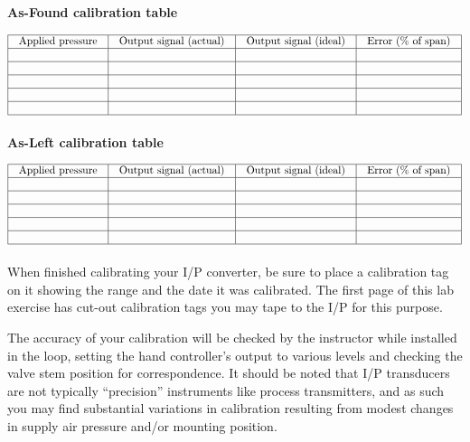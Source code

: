 \vskip 10pt

{\bf As-Found calibration table}


$$\vbox{\offinterlineskip
\halign{\strut
\vrule \quad\hfil # \ \hfil & 
\vrule \quad\hfil # \ \hfil & 
\vrule \quad\hfil # \ \hfil & 
\vrule \quad\hfil # \ \hfil \vrule \cr
\noalign{\hrule}
%
Applied pressure & Output signal (actual) & Output signal (ideal) & Error (\% of span) \cr
%
\noalign{\hrule}
%
 &  &  & \cr
%
\noalign{\hrule}
%
 &  &  & \cr
%
\noalign{\hrule}
%
 &  &  & \cr
%
\noalign{\hrule}
%
 &  &  & \cr
%
\noalign{\hrule}
%
 &  &  & \cr
%
\noalign{\hrule}
} %
}$$ %

\vskip 10pt

{\bf As-Left calibration table}


$$\vbox{\offinterlineskip
\halign{\strut
\vrule \quad\hfil # \ \hfil & 
\vrule \quad\hfil # \ \hfil & 
\vrule \quad\hfil # \ \hfil & 
\vrule \quad\hfil # \ \hfil \vrule \cr
\noalign{\hrule}
%
Applied pressure & Output signal (actual) & Output signal (ideal) & Error (\% of span) \cr
%
\noalign{\hrule}
%
 &  &  & \cr
%
\noalign{\hrule}
%
 &  &  & \cr
%
\noalign{\hrule}
%
 &  &  & \cr
%
\noalign{\hrule}
%
 &  &  & \cr
%
\noalign{\hrule}
%
 &  &  & \cr
%
\noalign{\hrule}
} %
}$$ %

When finished calibrating your I/P converter, be sure to place a calibration tag on it showing the range and the date it was calibrated.  The first page of this lab exercise has cut-out calibration tags you may tape to the I/P for this purpose.

The accuracy of your calibration will be checked by the instructor while installed in the loop, setting the hand controller's output to various levels and checking the valve stem position for correspondence.  It should be noted that I/P transducers are not typically ``precision'' instruments like process transmitters, and as such you may find substantial variations in calibration resulting from modest changes in supply air pressure and/or mounting position.

